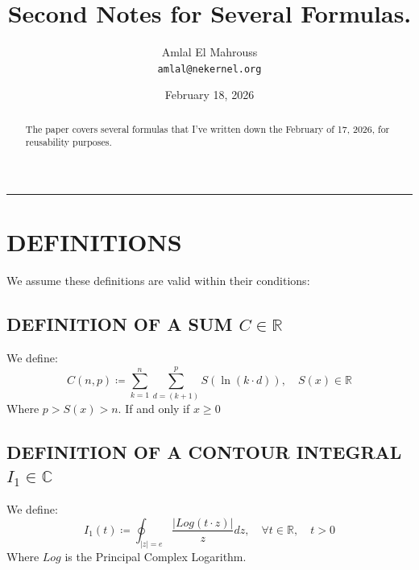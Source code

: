 \documentclass[11pt, a4paper]{article}
\title{Second Notes for Several Formulas.}
\author{Amlal El Mahrouss\\\texttt{amlal@nekernel.org}}
\date{February 18, 2026}
\begin{document}
\maketitle

\begin{center}
	\rule[0.01cm]{17cm}{0.01cm}
\end{center}

\begin{abstract}
\begin{center}
    The paper covers several formulas that I've written down the February of 17, 2026, for reusability purposes.
\end{center}
\end{abstract}

\section{DEFINITIONS}

We assume these definitions are valid within their conditions:

\subsection{DEFINITION OF A SUM $C \in \mathbb{R}$}
We define:
\begin{equation}
C(n, p) \coloneq \sum_{k=1}^{n} \sum_{d=(k+1)}^{p} S(\ln (k \cdot d)), \quad S(x) \in \mathbb{R}
\end{equation}
Where $p > S(x) > n$. If and only if $x \geq 0$ 

\subsection{DEFINITION OF A CONTOUR INTEGRAL $I_{1} \in \mathbb{C}$}
We define:
\begin{equation}
I_{1}(t) \coloneq \oint_{|z|=e} \frac{|Log(t\cdot z)|}{z}dz, \quad \forall t \in \mathbb{R}, \quad t > 0
\end{equation}
Where $Log$ is the Principal Complex Logarithm.
\end{document}
